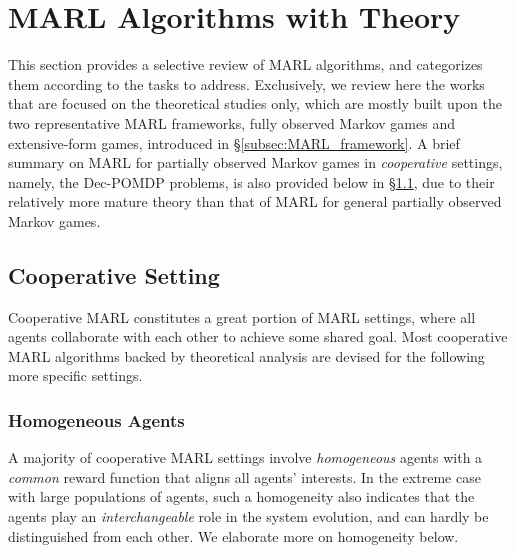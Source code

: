 \section{MARL Algorithms with Theory}\label{sec:algorithms}
This section  provides a selective  review of MARL algorithms, and categorizes them according to the tasks to address.  Exclusively, we  review here the works that are focused on the theoretical studies only, which are mostly built upon the two representative MARL frameworks, fully observed Markov games and extensive-form games, introduced in \S\ref{subsec:MARL_framework}. A brief summary  on MARL for partially observed Markov games in  \emph{cooperative}  settings, namely, the Dec-POMDP problems, is also provided below in \S\ref{subsec:cooperative_MARL_alg},  due to their relatively  more mature   theory than that of MARL for general partially observed Markov games.
 
\subsection{Cooperative Setting}\label{subsec:cooperative_MARL_alg}

Cooperative MARL constitutes a great portion of  MARL settings, where all agents collaborate with each other to achieve some shared goal. Most cooperative MARL algorithms backed by  theoretical analysis are devised for the following more specific settings. 


\subsubsection{Homogeneous Agents}\label{subsubsec:homo_agents}

A majority of cooperative MARL settings  involve \emph{homogeneous} agents with a \emph{common} reward function that aligns all agents' interests. In the extreme case with large populations of agents, such a homogeneity also indicates that the agents play an \emph{interchangeable}  role in the system evolution, and can hardly be distinguished from each other. We elaborate more on  homogeneity below. 

\vspace{6pt}
\vspace{3pt}

